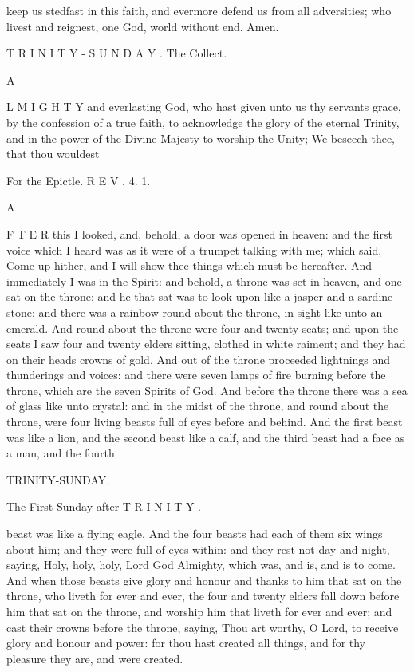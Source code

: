 keep us stedfast in this faith, and evermore defend us from all adversities; who livest and reignest, one God, world without end. Amen.

T R I N I T Y - S U N D A Y . The Collect.

A

L M I G H T Y and everlasting God, who hast given unto us thy servants grace, by the confession of a true faith, to acknowledge the glory of the eternal Trinity, and in the power of the Divine Majesty to worship the Unity; We beseech thee, that thou wouldest

For the Epictle. R E V . 4. 1.

A

F T E R this I looked, and, behold, a door was opened in heaven: and the first voice which I heard was as it were of a trumpet talking with me; which said, Come up hither, and I will show thee things which must be hereafter. And immediately I was in the Spirit: and behold, a throne was set in heaven, and one sat on the throne: and he that sat was to look upon like a jasper and a sardine stone: and there was a rainbow round about the throne, in sight like unto an emerald. And round about the throne were four and twenty seats; and upon the seats I saw four and twenty elders sitting, clothed in white raiment; and they had on their heads crowns of gold. And out of the throne proceeded lightnings and thunderings and voices: and there were seven lamps of fire burning before the throne, which are the seven Spirits of God. And before the throne there was a sea of glass like unto crystal: and in the midst of the throne, and round about the throne, were four living beasts full of eyes before and behind. And the first beast was like a lion, and the second beast like a calf, and the third beast had a face as a man, and the fourth

TRINITY-SUNDAY.

The First Sunday after T R I N I T Y .

beast was like a flying eagle. And the four beasts had each of them six wings about him; and they were full of eyes within: and they rest not day and night, saying, Holy, holy, holy, Lord God Almighty, which was, and is, and is to come. And when those beasts give glory and honour and thanks to him that sat on the throne, who liveth for ever and ever, the four and twenty elders fall down before him that sat on the throne, and worship him that liveth for ever and ever; and cast their crowns before the throne, saying, Thou art worthy, O Lord, to receive glory and honour and power: for thou hast created all things, and for thy pleasure they are, and were created.

